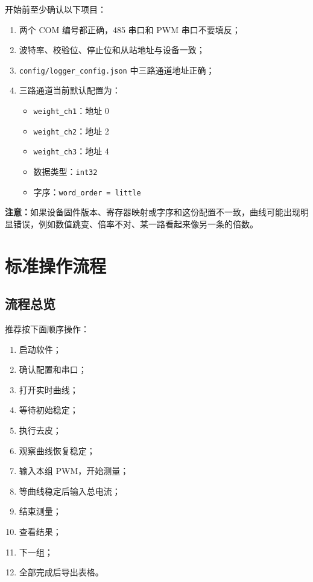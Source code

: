 \documentclass[11pt,a4paper]{ctexart}
\begin{document}
开始前至少确认以下项目：

\begin{enumerate}[leftmargin=2em]
  \item 两个 COM 编号都正确，485 串口和 PWM 串口不要填反；
  \item 波特率、校验位、停止位和从站地址与设备一致；
  \item \texttt{config/logger\_config.json} 中三路通道地址正确；
  \item 三路通道当前默认配置为：
  \begin{itemize}[leftmargin=2em]
    \item \texttt{weight\_ch1}：地址 0
    \item \texttt{weight\_ch2}：地址 2
    \item \texttt{weight\_ch3}：地址 4
    \item 数据类型：\texttt{int32}
    \item 字序：\texttt{word\_order = little}
  \end{itemize}
\end{enumerate}

\textbf{注意：}如果设备固件版本、寄存器映射或字序和这份配置不一致，曲线可能出现明显错误，例如数值跳变、倍率不对、某一路看起来像另一条的倍数。

\section{标准操作流程}

\subsection{流程总览}

推荐按下面顺序操作：

\begin{enumerate}[leftmargin=2em]
  \item 启动软件；
  \item 确认配置和串口；
  \item 打开实时曲线；
  \item 等待初始稳定；
  \item 执行去皮；
  \item 观察曲线恢复稳定；
  \item 输入本组 PWM，开始测量；
  \item 等曲线稳定后输入总电流；
  \item 结束测量；
  \item 查看结果；
  \item 下一组；
  \item 全部完成后导出表格。
\end{enumerate}
\end{document}
